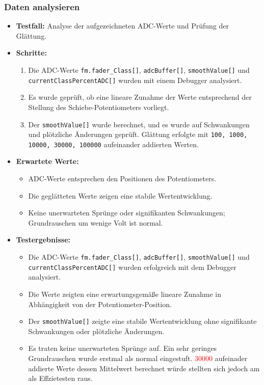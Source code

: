 \subsubsection{Daten analysieren}
\begin{itemize}
	\item \textbf{Testfall:} Analyse der aufgezeichneten ADC-Werte und Prüfung der Glättung.
	\item \textbf{Schritte:}
	\begin{enumerate}
		\item Die ADC-Werte \texttt{fm.fader\_Class[]}, \texttt{adcBuffer[]}, \texttt{smoothValue[]} und \texttt{currentClassPercentADC[]} wurden mit einem Debugger analysiert.
		\item Es wurde geprüft, ob eine lineare Zunahme der Werte entsprechend der Stellung des Schiebe-Potentiometers vorliegt.
		\item Der \texttt{smoothValue[]} wurde berechnet, und es wurde auf Schwankungen und plötzliche Änderungen geprüft. Glättung erfolgte mit \texttt{100, 1000, 10000, 30000, 100000} aufeinander addierten Werten.
	\end{enumerate}
	\item \textbf{Erwartete Werte:} 
	\begin{itemize}
		\item ADC-Werte entsprechen den Positionen des Potentiometers.
		\item Die geglätteten Werte zeigen eine stabile Wertentwicklung.
		\item Keine unerwarteten Sprünge oder signifikanten Schwankungen; Grundrauschen um wenige Volt ist normal.
	\end{itemize}
	\item \textbf{Testergebnisse:}
	\begin{itemize}
		\item Die ADC-Werte \texttt{fm.fader\_Class[]}, \texttt{adcBuffer[]}, \texttt{smoothValue[]} und \texttt{currentClassPercentADC[]} wurden erfolgreich mit dem Debugger analysiert.
		\item Die Werte zeigten eine erwartungsgemäße lineare Zunahme in Abhängigkeit von der Potentiometer-Position.
		\item Der \texttt{smoothValue[]} zeigte eine stabile Wertentwicklung ohne signifikante Schwankungen oder plötzliche Änderungen.
		\item Es traten keine unerwarteten Sprünge auf. Ein sehr geringes Grundrauschen wurde erstmal als normal eingestuft. \textcolor{red}{30000} aufeinader addierte Werte dessen Mittelwert berechnet würde stellten sich jedoch am als Effzietesten raus.
	\end{itemize}
\end{itemize}

